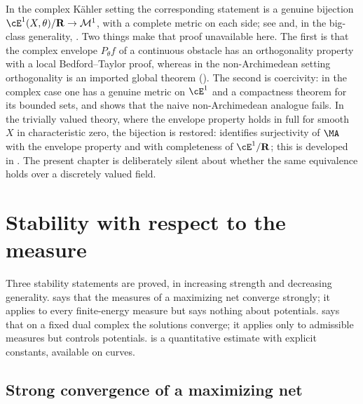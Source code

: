 \begin{remark}
\label{rem:ch28-cy-comparison}
In the complex K\"ahler setting the corresponding statement is a genuine
bijection \(\cE^1(X,\theta)/\mathbf R\to\mathcal M^1\), with a complete
metric on each side; see \cite{BBGZ13} and, in the big-class generality,
\cite{BEGZ10,BBEGZ16}.  Two things make that proof unavailable here.  The
first is that the complex envelope \(P_\theta f\) of a continuous obstacle
has an orthogonality property with a local Bedford--Taylor proof, whereas in
the non-Archimedean setting orthogonality is an imported global theorem
().  The second is coercivity: in the
complex case one has a genuine metric on \(\cE^1\) and a compactness theorem
for its bounded sets, and  shows that
the naive non-Archimedean analogue fails.  In the trivially valued theory,
where the envelope property holds in full for smooth \(X\) in characteristic
zero, the bijection is restored: \cite[Theorem~12.8]{BJ22} identifies
surjectivity of \(\MA\) with the envelope property and with completeness of
\(\cE^1/\mathbf R\); this is developed in
.  The present chapter
is deliberately silent about whether the same equivalence holds over a
discretely valued field.
\end{remark}

\section{Stability with respect to the measure}
\label{sec:ch28-stability}

Three stability statements are proved, in increasing strength and decreasing
generality.   says that the
measures of a maximizing net converge strongly; it applies to every
finite-energy measure but says nothing about potentials.
 says that on a fixed dual complex the
solutions converge; it applies only to admissible measures but controls
potentials.   is a quantitative estimate with
explicit constants, available on curves.

\subsection{Strong convergence of a maximizing net}
\label{sec:ch28-maximizing-net}

